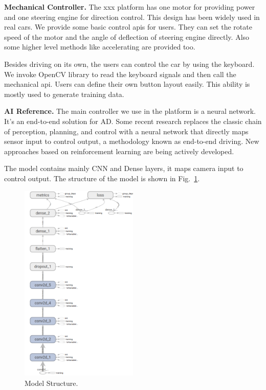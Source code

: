 \documentclass[conference]{IEEEtran}
\begin{document}
\begin{sloppypar}
\textbf{Mechanical Controller.} The xxx platform has one motor for providing power and one steering engine for direction control. This design has been widely used in real cars. We provide some basic control apis for users. They can set the rotate speed of the motor and the angle of deflection of steering engine directly. Also some higher level methods like accelerating are provided too. 

Besides driving on its own, the users can control the car by using the keyboard. We invoke OpenCV\cite{b20} library to read the keyboard signals and then call the mechanical api. Users can define their own button layout easily. This ability is mostly used to generate training data.

\textbf{AI Reference.} The main controller we use in the platform is a neural network. It's an end-to-end solution for AD. Some recent research replaces the classic chain of perception, planning, and control with a neural network that directly maps sensor input to control output\cite{b21, b22, b23}, a methodology known as end-to-end driving. New approaches based on reinforcement learning are being actively developed\cite{b24}.

The model contains mainly CNN and Dense layers\cite{b25}, it maps camera input to control output. The structure of the model is shown in Fig.~\ref{ms}.

\begin{figure}[htbp]
\centerline{\includegraphics[width=0.5\textwidth,height=0.5\textheight]{net-structure.png}}
\caption{Model Structure.}
\label{ms}
\end{figure}


\end{sloppypar}
\end{document}
